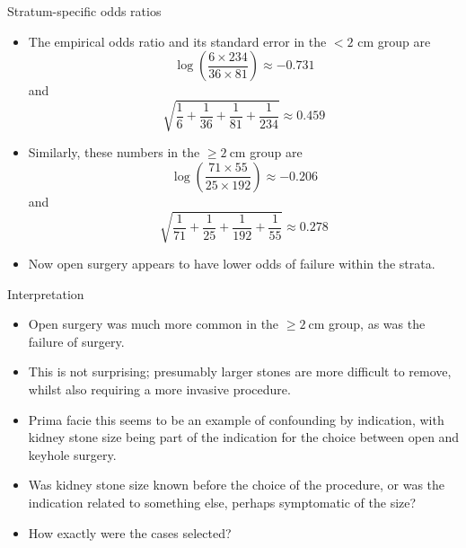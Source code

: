\documentclass[10pt,handout]{beamer}\usepackage[]{graphicx}\usepackage[]{color}
\begin{document}
\begin{frame}{Stratum-specific odds ratios}
	\begin{itemize}
		\item The empirical odds ratio and its standard error in the $<2$
		cm group are
		$$
		\log \left(\frac{6 \times 234}{36 \times 81}\right) \approx-0.731
		$$
		and
		$$
		\sqrt{\frac{1}{6}+\frac{1}{36}+\frac{1}{81}+\frac{1}{234}} \approx 0.459
		$$
		\item Similarly, these numbers in the $\geq 2 \mathrm{~cm}$ group are
		$$
		\log \left(\frac{71 \times 55}{25 \times 192}\right) \approx-0.206
		$$
		and
		$$
		\sqrt{\frac{1}{71}+\frac{1}{25}+\frac{1}{192}+\frac{1}{55}} \approx 0.278
		$$
		\item Now open surgery appears to have lower odds of failure within the strata.
	\end{itemize}
	
\end{frame}


\begin{frame}{Interpretation}
\begin{itemize}
	\item Open surgery was much more common in the $\geq 2 \mathrm{~cm}$ group, as was the failure of surgery.
	\item  This is not surprising; presumably larger stones are more difficult to remove, whilst also requiring a more invasive procedure.
	\item  Prima facie this seems to be an example of confounding by indication, with kidney stone size being part of the indication for the choice between open and keyhole
	surgery.
	\item  Was kidney stone size known before the choice of the procedure, or was the indication related to something else, perhaps symptomatic of the size?
	\item  How exactly were the cases selected?
\end{itemize}
\end{frame}
\end{document}
